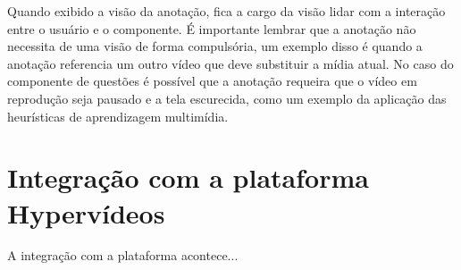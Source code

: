 Quando exibido a visão da anotação, fica a cargo da visão lidar com a interação entre o usuário e o componente. É importante lembrar que a anotação não necessita de uma visão de forma compulsória, um exemplo disso é quando a anotação referencia um outro vídeo que deve substituir a mídia atual. No caso do componente de questões é possível que a anotação requeira que o vídeo em reprodução seja pausado e a tela escurecida, como um exemplo da aplicação das heurísticas de aprendizagem multimídia.

\section{Integração com a plataforma Hypervídeos}

A integração com a plataforma acontece...